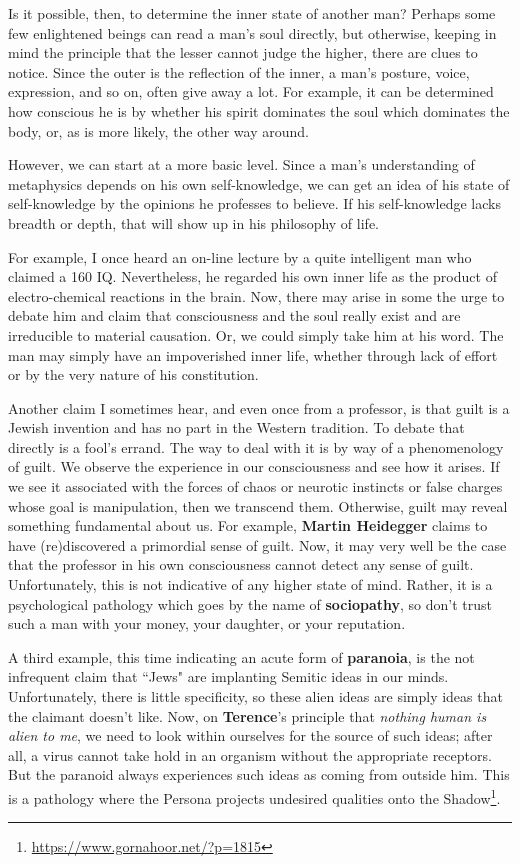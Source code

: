 Is it possible, then, to determine the inner state of another man? Perhaps some few enlightened beings can read a man's soul directly, but otherwise, keeping in mind the principle that the lesser cannot judge the higher, there are clues to notice. Since the outer is the reflection of the inner, a man's posture, voice, expression, and so on, often give away a lot. For example, it can be determined how conscious he is by whether his spirit dominates the soul which dominates the body, or, as is more likely, the other way around.

However, we can start at a more basic level. Since a man's understanding of metaphysics depends on his own self-knowledge, we can get an idea of his state of self-knowledge by the opinions he professes to believe. If his self-knowledge lacks breadth or depth, that will show up in his philosophy of life.

For example, I once heard an on-line lecture by a quite intelligent man who claimed a 160 IQ. Nevertheless, he regarded his own inner life as the product of electro-chemical reactions in the brain. Now, there may arise in some the urge to debate him and claim that consciousness and the soul really exist and are irreducible to material causation. Or, we could simply take him at his word. The man may simply have an impoverished inner life, whether through lack of effort or by the very nature of his constitution.

Another claim I sometimes hear, and even once from a professor, is that guilt is a Jewish invention and has no part in the Western tradition. To debate that directly is a fool's errand. The way to deal with it is by way of a phenomenology of guilt. We observe the experience in our consciousness and see how it arises. If we see it associated with the forces of chaos or neurotic instincts or false charges whose goal is manipulation, then we transcend them. Otherwise, guilt may reveal something fundamental about us. For example, \textbf{Martin Heidegger} claims to have (re)discovered a primordial sense of guilt. Now, it may very well be the case that the professor in his own consciousness cannot detect any sense of guilt. Unfortunately, this is not indicative of any higher state of mind. Rather, it is a psychological pathology which goes by the name of \textbf{sociopathy}, so don't trust such a man with your money, your daughter, or your reputation.

A third example, this time indicating an acute form of \textbf{paranoia}, is the not infrequent claim that ``Jews" are implanting Semitic ideas in our minds. Unfortunately, there is little specificity, so these alien ideas are simply ideas that the claimant doesn't like. Now, on \textbf{Terence}'s principle that \emph{nothing human is alien to me}, we need to look within ourselves for the source of such ideas; after all, a virus cannot take hold in an organism without the appropriate receptors. But the paranoid always experiences such ideas as coming from outside him. This is a pathology where the Persona projects undesired qualities onto the Shadow\footnote{\url{https://www.gornahoor.net/?p=1815}}.

